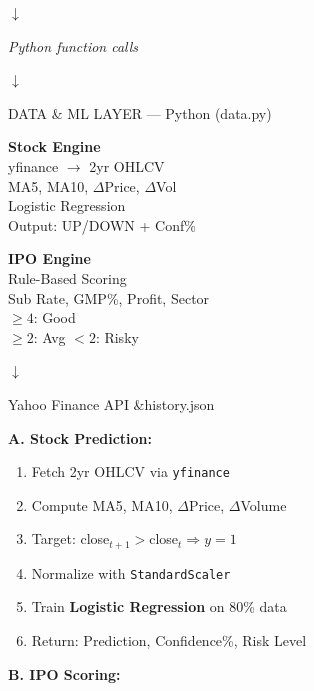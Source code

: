 \documentclass{article}
\newcommand{\bodyfont}{\fontsize{20}{24}\selectfont}
\newcommand{\smallfont}{\fontsize{18}{22}\selectfont}
\newcommand{\tinyfont}{\fontsize{15}{18}\selectfont}
\newcommand{\farrow}{%
  \par\vspace{2pt}%
  \begin{center}\color{bwacc}\Large$\downarrow$\end{center}%
  \vspace{2pt}}
\newcommand{\flabel}[1]{%
  \begin{center}\itshape\smallfont\color{gray}#1\end{center}}
\begin{document}
\begin{minipage}[t]{0.315\linewidth}
\begin{tcolorbox}[sbox, title={[5] System Architecture}]
\farrow\flabel{Python function calls}\farrow

\begin{tcolorbox}[flgreen]DATA \& ML LAYER --- Python (data.py)\end{tcolorbox}
\vspace{3pt}
\noindent
\begin{minipage}[t]{0.49\linewidth}
  \begin{tcolorbox}[chipg]
    \smallfont\textbf{\color{cgreen}Stock Engine}\\
    \tinyfont yfinance $\to$ 2yr OHLCV\\
    MA5, MA10, $\Delta$Price, $\Delta$Vol\\
    Logistic Regression\\
    Output: UP/DOWN + Conf\%
  \end{tcolorbox}
\end{minipage}\hfill
\begin{minipage}[t]{0.49\linewidth}
  \begin{tcolorbox}[chipg]
    \smallfont\textbf{\color{cgreen}IPO Engine}\\
    \tinyfont Rule-Based Scoring\\
    Sub Rate, GMP\%, Profit, Sector\\
    $\ge4$: Good\\
    $\ge2$: Avg \quad $<2$: Risky
  \end{tcolorbox}
\end{minipage}

\farrow

\begin{tcolorbox}[floworange]Yahoo Finance API \quad\&\quad history.json\end{tcolorbox}
\end{tcolorbox}

\vspace{8pt}

\begin{tcolorbox}[sbox, title={[6] Methodology}]
\bodyfont
\textbf{A. Stock Prediction:}
\begin{enumerate}[noitemsep,topsep=3pt,leftmargin=1.6em]
  \item Fetch 2yr OHLCV via \texttt{yfinance}
  \item Compute MA5, MA10, $\Delta$Price, $\Delta$Volume
  \item Target: close$_{t+1}>$close$_t \Rightarrow y=1$
  \item Normalize with \texttt{StandardScaler}
  \item Train \textbf{Logistic Regression} on 80\% data
  \item Return: Prediction, Confidence\%, Risk Level
\end{enumerate}
\vspace{5pt}
\textbf{B. IPO Scoring:}
\vspace{3pt}


\end{tcolorbox}
\end{minipage}
\end{document}
